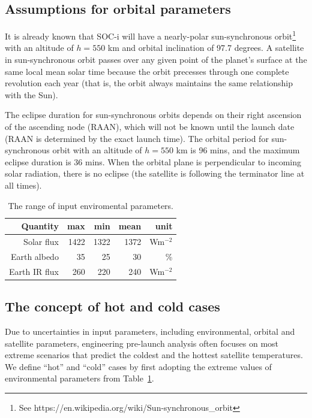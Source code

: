 \documentclass[]{aastex62}
\begin{document}
\subsection{Assumptions for orbital parameters}

It is already known that SOC-i will have a nearly-polar sun-synchronous 
orbit\footnote{See https://en.wikipedia.org/wiki/Sun-synchronous\_orbit} 
with an altitude of $h=550$ km and orbital inclination of 97.7 degrees. A satellite in sun-synchronous 
orbit passes over any given point of the planet's surface at the same local mean solar time because the 
orbit precesses through one complete revolution each year (that is, the orbit always maintains the same 
relationship with the Sun). 

The eclipse duration for sun-synchronous orbits depends on their right ascension of the 
ascending node (RAAN), which will not be known until the launch date (RAAN is determined
by the exact launch time). The orbital period for sun-synchronous orbit with an altitude of 
$h=550$ km is 96 mins, and the maximum eclipse duration is 36 mins.  When the orbital 
plane is perpendicular to incoming solar radiation, there is no eclipse (the satellite is following 
the terminator line at all times). 


\begin{table}[t]
	\centering
	\caption{The range of input enviromental parameters. }
	\label{tab:inputsEnvParam}
	\begin{tabular}{r|r|r|r|r} %
		\hline
  	         Quantity & max    &   min   &  mean &  unit            \\
		\hline
              Solar flux   &  1422  &  1322  &  1372 & Wm$^{-2}$  \\
           Earth albedo  &    35    &    25    &     30  &   \%            \\ 
            Earth IR flux &  260    &   220   &    240 & Wm$^{-2}$   \\
 		\hline
	\end{tabular} 
\end{table}


\subsection{The concept of hot and cold cases} 

Due to uncertainties in input parameters, including environmental, orbital and satellite parameters,
engineering pre-launch analysis often focuses on most extreme scenarios that predict the coldest 
and the hottest satellite temperatures. We define ``hot'' and ``cold'' cases by first adopting 
the extreme values of environmental parameters from Table~\ref{tab:inputsEnvParam}. 
\end{document}
